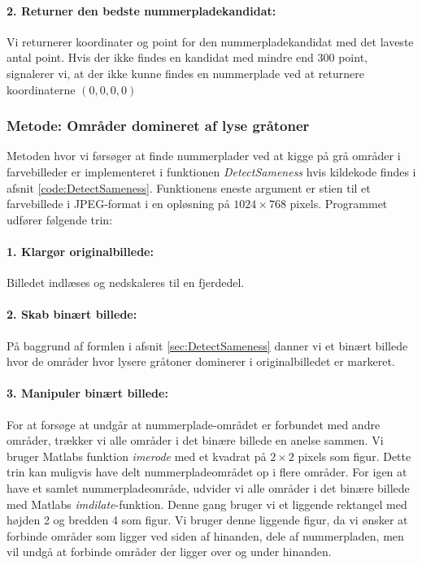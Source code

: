 \paragraph{2. Returner den bedste nummerpladekandidat:}
Vi returnerer koordinater og point for den nummerpladekandidat med det laveste antal point. Hvis der ikke findes en kandidat med mindre end 300 point, signalerer vi, at der ikke kunne findes en nummerplade ved at returnere koordinaterne $(0,0,0,0)$ 


\subsubsection{Metode: Områder domineret af lyse gråtoner}
Metoden hvor vi førsøger at finde nummerplader ved at kigge på grå områder i farvebilleder er implementeret i funktionen \textit{DetectSameness} hvis kildekode findes i afsnit \vref{code:DetectSameness}. Funktionens eneste argument er stien til et farvebillede i JPEG-format i en opløsning på $1024 \times 768$ pixels. Programmet udfører følgende trin:

\paragraph{1. Klargør originalbillede:}
Billedet indlæses og nedskaleres til en fjerdedel. 

\paragraph{2. Skab binært billede:}
På baggrund af formlen i afsnit \ref{sec:DetectSameness} danner vi et binært billede hvor de områder hvor lysere gråtoner dominerer i originalbilledet er markeret.

\paragraph{3. Manipuler binært billede:}
For at forsøge at undgår at nummerplade-området er forbundet med andre områder, trækker vi alle områder i det binære billede en anelse sammen. Vi bruger Matlabs funktion \textit{imerode} med et kvadrat på $2 \times 2$ pixels som figur. Dette trin kan muligvis have delt nummerpladeområdet op i flere områder. For igen at have et samlet nummerpladeområde, udvider vi alle områder i det binære billede med Matlabs \textit{imdilate}-funktion. Denne gang bruger vi et liggende rektangel med højden 2 og bredden 4 som figur. Vi bruger denne liggende figur, da vi ønsker at forbinde områder som ligger ved siden af hinanden, dele af nummerpladen, men vil undgå at forbinde områder der ligger over og under hinanden. 


